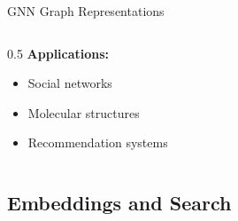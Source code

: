 \documentclass[aspectratio=169,xcolor=dvipsnames]{beamer}
\begin{document}
\begin{frame}{GNN Graph Representations}
\begin{columns}
\begin{column}{0.5\textwidth}
      \vspace{0.3cm}
      \textbf{Applications:}
      \begin{itemize}
        \item Social networks
        \item Molecular structures
        \item Recommendation systems
      \end{itemize}
    \end{column}
  \end{columns}
\end{frame}

\subsection{Embeddings and Search}
\end{document}
